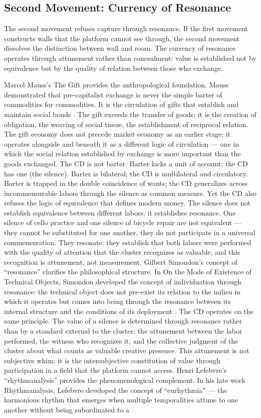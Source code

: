 \subsection{Second Movement: Currency of Resonance}

The second movement refuses capture through resonance. If the first movement constructs walls that the platform cannot see through, the second movement dissolves the distinction between wall and room. The currency of resonance operates through attunement rather than concealment: value is established not by equivalence but by the quality of relation between those who exchange.

Marcel Mauss’s The Gift provides the anthropological foundation. Mauss demonstrated that pre-capitalist exchange is never the simple barter of commodities for commodities. It is the circulation of gifts that establish and maintain social bonds \cite{mauss_1990}. The gift exceeds the transfer of goods; it is the creation of obligation, the weaving of social tissue, the establishment of reciprocal relation. The gift economy does not precede market economy as an earlier stage; it operates alongside and beneath it as a different logic of circulation — one in which the social relation established by exchange is more important than the goods exchanged. The CD is not barter. Barter lacks a unit of account; the CD has one (the silence). Barter is bilateral; the CD is multilateral and circulatory. Barter is trapped in the double coincidence of wants; the CD generalizes across incommensurable labors through the silence as common measure. Yet the CD also refuses the logic of equivalence that defines modern money. The silence does not establish equivalence between different labors; it establishes resonance. One silence of cello practice and one silence of bicycle repair are not equivalent — they cannot be substituted for one another, they do not participate in a universal commensuration. They resonate: they establish that both labors were performed with the quality of attention that the cluster recognizes as valuable, and this recognition is attunement, not measurement. Gilbert Simondon’s concept of “resonance” clarifies the philosophical structure. In On the Mode of Existence of Technical Objects, Simondon developed the concept of individuation through resonance: the technical object does not pre-exist its relation to the milieu in which it operates but comes into being through the resonance between its internal structure and the conditions of its deployment \cite[pp.~51--78]{simondon_2017}. The CD operates on the same principle. The value of a silence is determined through resonance rather than by a standard external to the cluster: the attunement between the labor performed, the witness who recognizes it, and the collective judgment of the cluster about what counts as valuable creative presence. This attunement is not subjective whim; it is the intersubjective constitution of value through participation in a field that the platform cannot access. Henri Lefebvre’s “rhythmanalysis” provides the phenomenological complement. In his late work Rhythmanalysis, Lefebvre developed the concept of “eurhythmia” — the harmonious rhythm that emerges when multiple temporalities attune to one another without being subordinated to a 